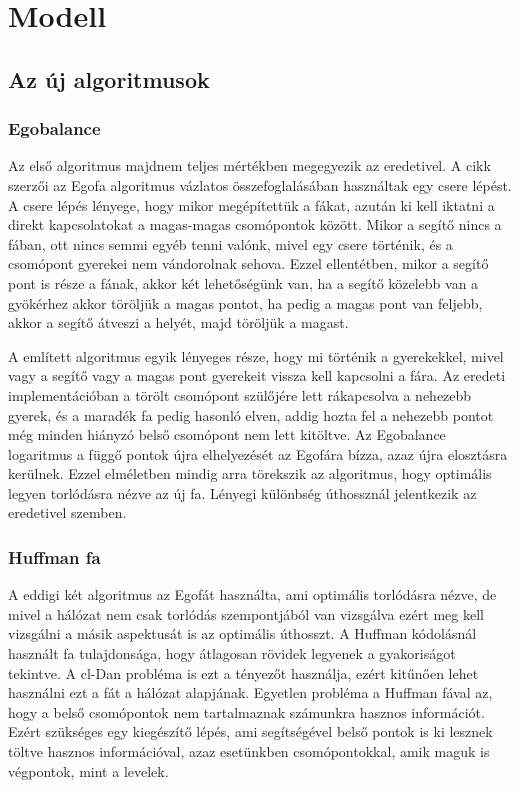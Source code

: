 \documentclass[12pt]{report}
\begin{document}
\chapter{Modell}

\section{Az új algoritmusok}

\subsection{Egobalance}

Az első algoritmus majdnem teljes mértékben megegyezik az eredetivel.
A cikk szerzői az Egofa algoritmus vázlatos összefoglalásában használtak egy csere lépést.
A csere lépés lényege, hogy mikor megépítettük a fákat, azután ki kell iktatni a direkt kapcsolatokat a magas-magas csomópontok között.
Mikor a segítő nincs a fában, ott nincs semmi egyéb tenni valónk, mivel egy csere történik, és a csomópont gyerekei nem vándorolnak sehova.
Ezzel ellentétben, mikor a segítő pont is része a fának, akkor két lehetőségünk van, ha a segítő közelebb van a gyökérhez akkor töröljük a magas pontot, ha pedig a magas pont van feljebb, akkor a segítő átveszi a helyét, majd töröljük a magast.

A említett algoritmus egyik lényeges része, hogy mi történik a gyerekekkel, mivel vagy a segítő vagy a magas pont gyerekeit vissza kell kapcsolni a fára.
Az eredeti implementációban a törölt csomópont szülőjére lett rákapcsolva a nehezebb gyerek, és a maradék fa pedig hasonló elven, addig hozta fel a nehezebb pontot még minden hiányzó belső csomópont nem lett kitöltve. 
Az Egobalance logaritmus a függő pontok újra elhelyezését az Egofára bízza, azaz újra elosztásra kerülnek.
Ezzel elméletben mindig arra törekszik az algoritmus, hogy optimális legyen torlódásra nézve az új fa.
Lényegi különbség úthossznál jelentkezik az eredetivel szemben.

\subsection{Huffman fa}

A eddigi két algoritmus az Egofát használta, ami optimális torlódásra nézve, de mivel a hálózat nem csak torlódás szempontjából van vizsgálva ezért meg kell vizsgálni a másik aspektusát is az optimális úthosszt.
A Huffman kódolásnál használt fa tulajdonsága, hogy átlagosan rövidek legyenek a gyakoriságot tekintve.
A cl-Dan probléma is ezt a tényezőt használja, ezért kitűnően lehet használni ezt a fát a hálózat alapjának.
Egyetlen probléma a Huffman fával az, hogy a belső csomópontok nem tartalmaznak számunkra hasznos információt.
Ezért szükséges egy kiegészítő lépés, ami segítségével belső pontok is ki lesznek töltve hasznos információval, azaz esetünkben csomópontokkal, amik maguk is végpontok, mint a levelek.
\end{document}
